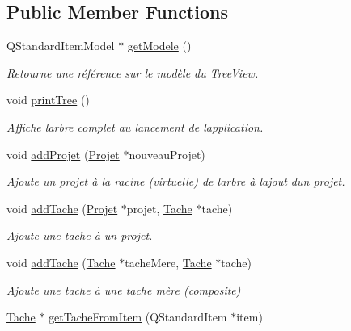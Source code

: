 \subsection*{Public Member Functions}
\begin{DoxyCompactItemize}
\item 
Q\+Standard\+Item\+Model $\ast$ \hyperlink{class_tree_view_model_af5e7f6992ae03a0c27130430b3c753f4}{get\+Modele} ()
\begin{DoxyCompactList}\small\item\em Retourne une référence sur le modèle du Tree\+View. \end{DoxyCompactList}\item 
void \hyperlink{class_tree_view_model_ac373475bea94e84c15588628f8e140d2}{print\+Tree} ()
\begin{DoxyCompactList}\small\item\em Affiche l\textquotesingle{}arbre complet au lancement de l\textquotesingle{}application. \end{DoxyCompactList}\item 
void \hyperlink{class_tree_view_model_ad7c89e0477e9da08cf71e73d023e3155}{add\+Projet} (\hyperlink{class_projet}{Projet} $\ast$nouveau\+Projet)
\begin{DoxyCompactList}\small\item\em Ajoute un projet à la racine (virtuelle) de l\textquotesingle{}arbre à l\textquotesingle{}ajout d\textquotesingle{}un projet. \end{DoxyCompactList}\item 
void \hyperlink{class_tree_view_model_a0e4a0fd3f762ca89591914494b0b8abd}{add\+Tache} (\hyperlink{class_projet}{Projet} $\ast$projet, \hyperlink{class_tache}{Tache} $\ast$tache)
\begin{DoxyCompactList}\small\item\em Ajoute une tache à un projet. \end{DoxyCompactList}\item 
void \hyperlink{class_tree_view_model_a3b36fb846f9bb7753fcf2d8e04b99bad}{add\+Tache} (\hyperlink{class_tache}{Tache} $\ast$tache\+Mere, \hyperlink{class_tache}{Tache} $\ast$tache)
\begin{DoxyCompactList}\small\item\em Ajoute une tache à une tache mère (composite) \end{DoxyCompactList}\item 
\hyperlink{class_tache}{Tache} $\ast$ \hyperlink{class_tree_view_model_ac036b65c8296ff50d616c06e5a9decfa}{get\+Tache\+From\+Item} (Q\+Standard\+Item $\ast$item)

\end{DoxyCompactItemize}
